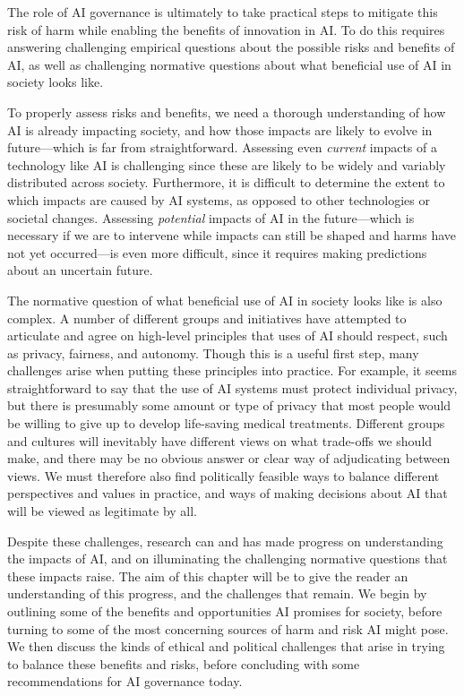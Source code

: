 \documentclass{article}
\begin{document}
The role of AI governance is ultimately to take practical steps to mitigate this risk of harm while enabling the benefits of innovation in AI. To do this requires answering challenging empirical questions about the possible risks and benefits of AI, as well as challenging normative questions about what beneficial use of AI in society looks like.

To properly assess risks and benefits, we need a thorough understanding of how AI is already impacting society, and how those impacts are likely to evolve in future---which is far from straightforward. Assessing even \textit{current} impacts of a technology like AI is challenging since these are likely to be widely and variably distributed across society. Furthermore, it is difficult to determine the extent to which impacts are caused by AI systems, as opposed to other technologies or societal changes. Assessing \textit{potential} impacts of AI in the future---which is necessary if we are to intervene while impacts can still be shaped and harms have not yet occurred---is even more difficult, since it requires making predictions about an uncertain future.

The normative question of what beneficial use of AI in society looks like is also complex. A number of different groups and initiatives have attempted to articulate and agree on high-level principles that uses of AI should respect, such as privacy, fairness, and autonomy\citep{jobin_global_2019}. Though this is a useful first step, many challenges arise when putting these principles into practice. For example, it seems straightforward to say that the use of AI systems must protect individual privacy, but there is presumably some amount or type of privacy that most people would be willing to give up to develop life-saving medical treatments. Different groups and cultures will inevitably have different views on what trade-offs we should make, and there may be no obvious answer or clear way of adjudicating between views. We must therefore also find politically feasible ways to balance different perspectives and values in practice, and ways of making decisions about AI that will be viewed as legitimate by all.

Despite these challenges, research can and has made progress on understanding the impacts of AI, and on illuminating the challenging normative questions that these impacts raise. The aim of this chapter will be to give the reader an understanding of this progress, and the challenges that remain. We begin by outlining some of the benefits and opportunities AI promises for society, before turning to some of the most concerning sources of harm and risk AI might pose. We then discuss the kinds of ethical and political challenges that arise in trying to balance these benefits and risks, before concluding with some recommendations for AI governance today.
\end{document}
